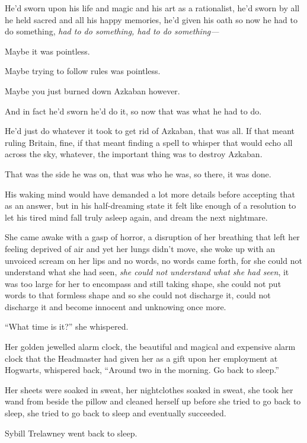 He’d sworn upon his life and magic and his art as a rationalist, he’d sworn by all he held sacred and all his happy memories, he’d given his oath so now he had to do something, \emph{had to do something, had to \emph{do something—}}

Maybe it was pointless.

Maybe trying to follow rules was pointless.

Maybe you just burned down Azkaban however.

And in fact he’d sworn he’d do it, so now that was what he had to do.

He’d just do whatever it took to get rid of Azkaban, that was all. If that meant ruling Britain, fine, if that meant finding a spell to whisper that would echo all across the sky, whatever, the important thing was to destroy Azkaban.

That was the side he was on, that was who he was, so there, it was done.

His waking mind would have demanded a lot more details before accepting that as an answer, but in his half-dreaming state it felt like enough of a resolution to let his tired mind fall truly asleep again, and dream the next nightmare.


She came awake with a gasp of horror, a disruption of her breathing that left her feeling deprived of air and yet her lungs didn’t move, she woke up with an unvoiced scream on her lips and no words, no words came forth, for she could not understand what she had seen, \emph{she could not understand what she had seen}, it was too large for her to encompass and still taking shape, she could not put words to that formless shape and so she could not discharge it, could not discharge it and become innocent and unknowing once more.

“What time is it?” she whispered.

Her golden jewelled alarm clock, the beautiful and magical and expensive alarm clock that the Headmaster had given her as a gift upon her employment at Hogwarts, whispered back, “Around two in the morning. Go back to sleep.”

Her sheets were soaked in sweat, her nightclothes soaked in sweat, she took her wand from beside the pillow and cleaned herself up before she tried to go back to sleep, she tried to go back to sleep and eventually succeeded.

Sybill Trelawney went back to sleep.
